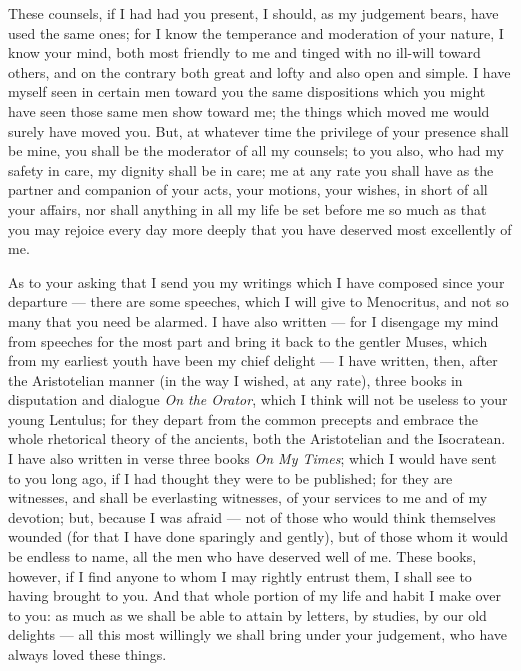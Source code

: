  These counsels, if I had had you present, I should, as my judgement bears, have used the same ones; for I know the temperance and moderation of your nature, I know your mind, both most friendly to me and tinged with no ill-will toward others, and on the contrary both great and lofty and also open and simple. I have myself seen in certain men toward you the same dispositions which you might have seen those same men show toward me; the things which moved me would surely have moved you. But, at whatever time the privilege of your presence shall be mine, you shall be the moderator of all my counsels; to you also, who had my safety in care, my dignity shall be in care; me at any rate you shall have as the partner and companion of your acts, your motions, your wishes, in short of all your affairs, nor shall anything in all my life be set before me so much as that you may rejoice every day more deeply that you have deserved most excellently of me.

 As to your asking that I send you my writings which I have composed since your departure --- there are some speeches, which I will give to Menocritus, and not so many that you need be alarmed. I have also written --- for I disengage my mind from speeches for the most part and bring it back to the gentler Muses, which from my earliest youth have been my chief delight --- I have written, then, after the Aristotelian manner (in the way I wished, at any rate), three books in disputation and dialogue \textit{On the Orator}, which I think will not be useless to your young Lentulus; for they depart from the common precepts and embrace the whole rhetorical theory of the ancients, both the Aristotelian and the Isocratean. I have also written in verse three books \textit{On My Times}; which I would have sent to you long ago, if I had thought they were to be published; for they are witnesses, and shall be everlasting witnesses, of your services to me and of my devotion; but, because I was afraid --- not of those who would think themselves wounded (for that I have done sparingly and gently), but of those whom it would be endless to name, all the men who have deserved well of me. These books, however, if I find anyone to whom I may rightly entrust them, I shall see to having brought to you. And that whole portion of my life and habit I make over to you: as much as we shall be able to attain by letters, by studies, by our old delights --- all this most willingly we shall bring under your judgement, who have always loved these things.

